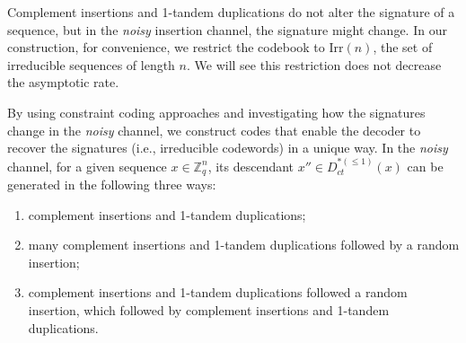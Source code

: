 \documentclass[pdflatex,sn-mathphys-num]{sn-jnl}
\theoremstyle{theorem}%
\theoremstyle{definition}
\theoremstyle{construction}
\newtheorem{open problem}{Open problem}
\begin{document}
Complement insertions and 1-tandem duplications do not alter the signature of a sequence, but in the \textit{noisy} insertion channel, the signature might change. In our construction, for convenience, we restrict the codebook to $\mathrm{Irr}(n)$, the set of irreducible sequences of length $n$. We will see this restriction does not decrease the asymptotic rate.\par 
By using constraint coding approaches and investigating how the signatures change in the \textit{noisy} channel, we construct codes that enable the decoder to recover the signatures (i.e., irreducible codewords) in a unique way. In the \textit{noisy} channel, for a given sequence $x\in \mathbb{Z}_{q}^{n}$, its descendant $x''\in D_{ct}^{*(\le 1)}(x)$ can be generated in the following three ways:
 \begin{enumerate}
 \item complement insertions and 1-tandem duplications;
 \item  many complement insertions and 1-tandem duplications followed by a random insertion;
 \item  complement insertions and 1-tandem duplications followed a random insertion, which followed by complement insertions and 1-tandem duplications.
 \end{enumerate}
 
\end{document}
